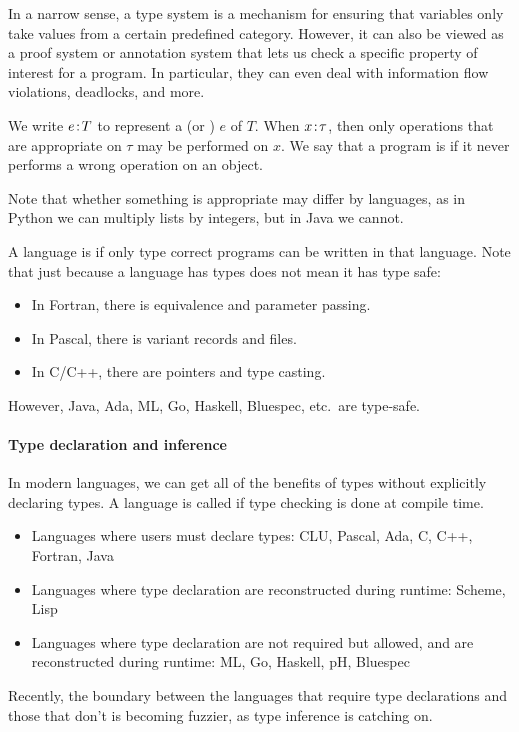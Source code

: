 \documentclass[class=scrartcl]{standalone}
\begin{document}
In a narrow sense, a type system is a mechanism for ensuring that
variables only take values from a certain predefined category.
However, it can also be viewed as a proof system or annotation system
that lets us check a specific property of interest for a program.
In particular, they can even deal with information flow violations,
deadlocks, and more.

We write \(e {\hspace{0.1111em}:\hspace{0.1111em}} T\) to represent
a  (or ) \(e\) of  \(T\).
When \(x {\hspace{0.1111em}:\hspace{0.1111em}} \tau\), then only operations that
are appropriate on \(\tau\) may be performed on \(x\).
We say that a program is  if
it never performs a wrong operation on an object.

Note that whether something is appropriate may differ by languages,
as in Python we can multiply lists by integers, but in Java we cannot.

A language is  if only type correct programs
can be written in that language.
Note that just because a language has types does not mean it has type safe:
\begin{itemize}[nosep]
  \item In Fortran, there is equivalence and parameter passing.
  \item In Pascal, there is variant records and files.
  \item In C/C++, there are pointers and type casting.
\end{itemize}
However, Java, Ada, ML, Go, Haskell, Bluespec, etc.\ are type-safe.

\paragraph{Type declaration and inference}
In modern languages, we can get all of the benefits of types without
explicitly declaring types.
A language is called  if
type checking is done at compile time.
\begin{itemize}
  \item Languages where users must declare types:
        CLU, Pascal, Ada, C, C++, Fortran, Java
  \item Languages where type declaration are reconstructed during runtime:
        Scheme, Lisp
  \item Languages where type declaration are not required but allowed,
        and are reconstructed during runtime:
        ML, Go, Haskell, pH, Bluespec
\end{itemize}
Recently, the boundary between the languages that require
type declarations and those that don't is becoming fuzzier,
as type inference is catching on.
\end{document}
